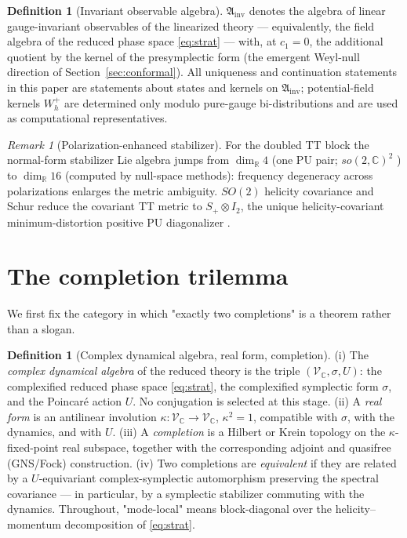 \documentclass[11pt]{article}
\theoremstyle{definition}
\newtheorem{definition}[theorem]{Definition}
\theoremstyle{remark}
\newtheorem{remark}[theorem]{Remark}
\newcommand{\C}{\mathbb{C}}
\newcommand{\R}{\mathbb{R}}
\begin{document}
\begin{definition}[Invariant observable algebra]\label{def:Ainv}
$\mathfrak A_{\mathrm{inv}}$ denotes the algebra of linear gauge-invariant
observables of the linearized theory --- equivalently, the field algebra
of the reduced phase space \eqref{eq:strat} --- with, at $c_1=0$, the
additional quotient by the kernel of the presymplectic form (the emergent
Weyl-null direction of Section~\ref{sec:conformal}).  All uniqueness and
continuation statements in this paper are statements about states and
kernels on $\mathfrak A_{\mathrm{inv}}$; potential-field kernels
$W^+_h$ are determined only modulo pure-gauge bi-distributions and are
used as computational representatives.
\end{definition}

\begin{remark}[Polarization-enhanced stabilizer]
For the doubled TT block the normal-form stabilizer Lie algebra jumps from
$\dim_\R 4$ (one PU pair; $so(2,\C)^2$ \cite{companion1}) to $\dim_\R16$
(computed by null-space methods): frequency degeneracy across
polarizations enlarges the metric ambiguity.  $SO(2)$ helicity covariance
and Schur reduce the covariant TT metric to $S_+\otimes I_2$, the unique
helicity-covariant minimum-distortion positive PU diagonalizer
\cite{companion2}.
\end{remark}

\section{The completion trilemma}\label{sec:trilemma}

We first fix the category in which "exactly two completions" is a
theorem rather than a slogan.

\begin{definition}[Complex dynamical algebra, real form, completion]
\label{def:realform}
(i) The \emph{complex dynamical algebra} of the reduced theory is the
triple $(\mathcal V_\C,\sigma,U)$: the complexified reduced phase space
\eqref{eq:strat}, the complexified symplectic form $\sigma$, and the
Poincar\'e action $U$.  No conjugation is selected at this stage.
(ii) A \emph{real form} is an antilinear involution
$\kappa:\mathcal V_\C\to\mathcal V_\C$, $\kappa^2=1$, compatible with
$\sigma$, with the dynamics, and with $U$.
(iii) A \emph{completion} is a Hilbert or Krein topology on the
$\kappa$-fixed-point real subspace, together with the corresponding
adjoint and quasifree (GNS/Fock) construction.
(iv) Two completions are \emph{equivalent} if they are related by a
$U$-equivariant complex-symplectic automorphism preserving the spectral
covariance --- in particular, by a symplectic stabilizer commuting with
the dynamics.  Throughout, "mode-local" means block-diagonal over the
helicity--momentum decomposition of \eqref{eq:strat}.
\end{definition}
\end{document}
